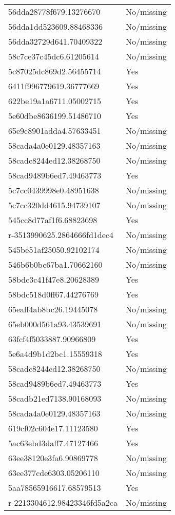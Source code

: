 \begin{tabular}{ll}
56dda28778f679.13276670 & No/missing \\
56dda1dd523609.88468336 & No/missing \\
56dda32729d641.70409322 & No/missing \\
58c7ce37c45dc6.61205614 & No/missing \\
5c87025dc869d2.56455714 & Yes \\
6411f996779619.36777669 & Yes \\
622be19a1a6711.05002715 & Yes \\
5e60dbe8636199.51486710 & Yes \\
65e9c8901adda4.57633451 & No/missing \\
58cada4a0e0129.48357163 & No/missing \\
58cadc8244ed12.38268750 & No/missing \\
58cad9489b6ed7.49463773 & Yes \\
5c7cc0439998e0.48951638 & No/missing \\
5c7cc320dd4615.94739107 & No/missing \\
545cc8d77af1f6.68823698 & Yes \\
r-3513990625.2864666fd1dec4 & No/missing \\
545be51af25050.92102174 & No/missing \\
546b6b0bc67ba1.70662160 & No/missing \\
58bdc3c41f47e8.20628389 & Yes \\
58bdc518d0ff67.44276769 & Yes \\
65eaff4ab8bc26.19445078 & No/missing \\
65eb000d561a93.43539691 & No/missing \\
63fcf4f5033887.90966809 & Yes \\
5e6a4d9b1d2bc1.15559318 & Yes \\
58cadc8244ed12.38268750 & No/missing \\
58cad9489b6ed7.49463773 & Yes \\
58cadb21ed7138.90168093 & No/missing \\
58cada4a0e0129.48357163 & No/missing \\
619cf02c604e17.11123580 & Yes \\
5ac63ebd3daff7.47127466 & Yes \\
63ee38120e3fa6.90869778 & No/missing \\
63ee377cde6303.05206110 & No/missing \\
5aa78565916617.68579513 & Yes \\
r-2213304612.98423346fd5a2ca & No/missing \\

\end{tabular}
